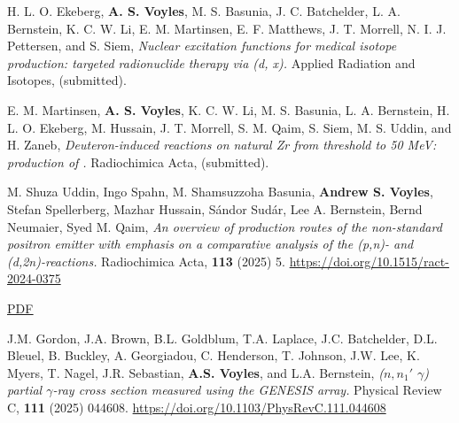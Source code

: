 \begin{bibsection}

\item H. L. O. Ekeberg, \textbf{A. S. Voyles}, M. S. Basunia, J. C. Batchelder, L. A. Bernstein, K. C. W. Li, E. M. Martinsen, E. F. Matthews, J. T. Morrell, N. I. J. Pettersen, and S. Siem, \emph{Nuclear excitation functions for medical isotope production: targeted radionuclide therapy via (d, x).} Applied Radiation and Isotopes, (submitted).



\item E. M. Martinsen, \textbf{A. S. Voyles}, K. C. W. Li, M. S. Basunia, L. A. Bernstein, H. L. O. Ekeberg, M.
Hussain, J. T. Morrell, S. M. Qaim, S. Siem, M. S. Uddin, and H. Zaneb, \emph{Deuteron-induced reactions on natural Zr from threshold to 50 MeV: production of .} Radiochimica Acta, (submitted).



\item M. Shuza Uddin, Ingo Spahn, M. Shamsuzzoha Basunia, \textbf{Andrew S. Voyles}, Stefan Spellerberg, Mazhar Hussain, Sándor Sudár, Lee A. Bernstein, Bernd Neumaier, Syed M. Qaim, \emph{An overview of production routes of the non-standard positron emitter  with emphasis on a comparative analysis of the (p,n)- and (d,2n)-reactions.} Radiochimica Acta, \textbf{113} (2025) 5. \url{https://doi.org/10.1515/ract-2024-0375}

\ifshort \vspace{0.1cm} \href{https://avoyles.github.io/papers/Uddin2025_86Y.pdf}{\underline{PDF}} \else  \fi


\item J.M. Gordon, J.A. Brown, B.L. Goldblum, T.A. Laplace, J.C. Batchelder, D.L. Bleuel, B. Buckley, A. Georgiadou, C. Henderson, T. Johnson, J.W. Lee, K. Myers, T. Nagel, J.R. Sebastian, \textbf{A.S. Voyles}, and L.A. Bernstein, \emph{($n,n_1'$ $\gamma$) partial $\gamma$-ray cross section measured using the GENESIS array.} Physical Review C, \textbf{111} (2025) 044608. \url{https://doi.org/10.1103/PhysRevC.111.044608}


\end{bibsection}
